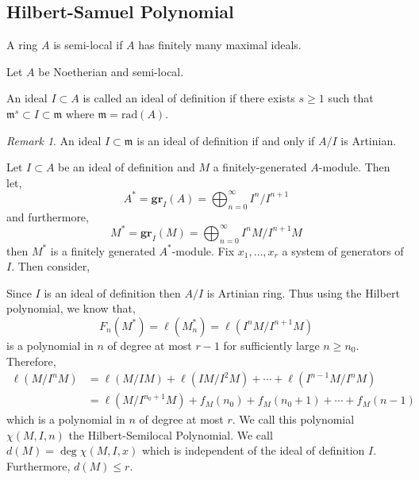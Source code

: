 \documentclass[12pt]{article}
\newcommand{\rad}[1]{\mathrm{rad}\left( #1 \right)}
\newcommand{\gr}[2]{\mathbf{gr}_{#1}\left(#2\right)}
\newcommand{\m}{\mathfrak{m}}
\theoremstyle{remark}
\newtheorem*{remark}{Remark}
\theoremstyle{definition}
\newenvironment{definition}[1][Definition:]{\begin{trivlist}
\item[\hskip \labelsep {\bfseries #1}]}{\end{trivlist}}
\begin{document}
\subsection{Hilbert-Samuel Polynomial}

\begin{definition}
A ring $A$ is semi-local if $A$ has finitely many maximal ideals.
\end{definition}

Let $A$ be Noetherian and semi-local. 

\begin{definition}
An ideal $I \subset A$ is called an ideal of definition if there exists $s \ge 1$ such that $\m^s \subset I \subset \m$ where $\m = \rad{A}$. 
\end{definition}

\begin{remark}
An ideal $I \subset \m$ is an ideal of definition if and only if $A / I$ is Artinian. 
\end{remark}

\begin{definition}
Let $I \subset A$ be an ideal of definition and $M$ a finitely-generated $A$-module. Then let,
\[ A^* = \gr{I}{A} = \bigoplus_{n = 0}^{\infty} I^n / I^{n+1} \]
and furthermore,
\[ M^* = \gr{I}{M} = \bigoplus_{n = 0}^\infty I^n M / I^{n+1} M \]
then $M^*$ is a finitely generated $A^*$-module. Fix $x_1, \dots, x_r$ a system of generators of $I$. Then consider,
\begin{center}
\end{center}
Since $I$ is an ideal of definition then $A / I$ is Artinian ring. Thus using the Hilbert polynomial, we know that,
\[ F_n(M^*) = \ell(M_n^*) = \ell(I^n M / I^{n+1}M) \]
is a polynomial in $n$ of degree at most $r - 1$ for sufficiently large $n \ge n_0$. Therefore,
\begin{align*}
\ell(M / I^n M) & = \ell(M/IM) + \ell(IM/I^2M) + \cdots + \ell(I^{n-1}M/I^n M) 
\\
& = \ell(M / I^{n_0 + 1}M) + f_M(n_0) + f_M(n_0 + 1) + \cdots + f_M(n-1) 
\end{align*}
which is a polynomial in $n$ of degree at most $r$. We call this polynomial $\chi(M, I, n)$ the Hilbert-Semilocal Polynomial. We call $d(M) = \deg{\chi(M, I, x)}$ which is independent of the ideal of definition $I$. Furthermore, $d(M) \le r$.   
\end{definition}
\end{document}
